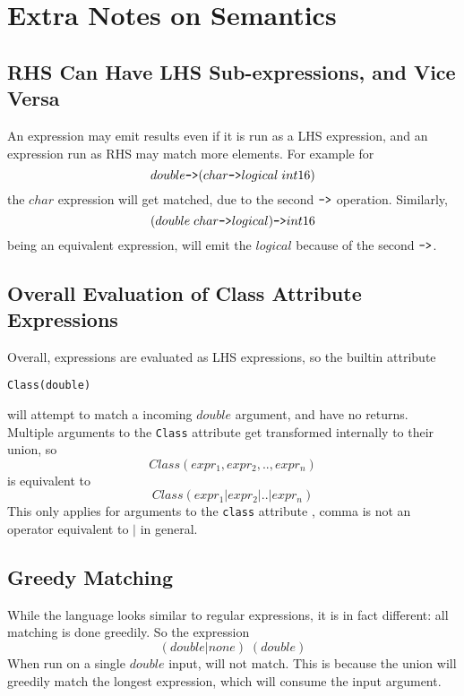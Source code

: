\section{Extra Notes on Semantics }

\subsection{RHS Can Have LHS Sub-expressions, and Vice Versa}
An expression may emit results even if it is run as a LHS
expression, and an expression run as RHS may match more elements. For
example for
\begin{equation*}
  double \text{{\tt ->}} (char \text{{\tt ->}} logical  \phantom{.}  int16)
\end{equation*}
the $char$ expression will get matched, due to the second $\text{{\tt ->}}$
operation. Similarly,
\begin{equation*}
  (double  \phantom{.}  char \text{{\tt ->}} logical) \text{{\tt ->}} int16
\end{equation*}
being an equivalent expression, will emit the $logical$ because of the second $\text{{\tt ->}}$.



\subsection{Overall Evaluation of Class Attribute Expressions}
Overall, expressions are evaluated as LHS expressions, so the builtin attribute
\begin{center}
{\tt   Class(double) }
\end{center}
will attempt to match a incoming $double$ argument, and have no returns.
Multiple arguments to the {\tt Class} attribute  get transformed internally to
their union, so
\begin{equation*}
  Class(expr_1,expr_2,..,expr_n)
\end{equation*}
is equivalent to
\begin{equation*}
  Class(expr_1 | expr_2 | .. | expr_n)
\end{equation*}
This only applies for arguments to the {\tt class} attribute , comma is not an
operator equivalent to $|$ in general.



\subsection{Greedy Matching}
While the language looks similar to regular expressions, it is in fact
different: all matching is done greedily.
So the expression
\begin{equation*}
  (double | none)  \phantom{.}  (double)
\end{equation*}
When run on a single $double$ input, will not match. This is because the
union will greedily match the longest expression, which will consume
the input argument.



